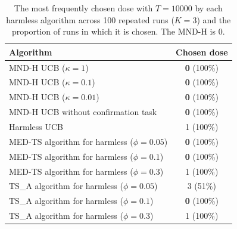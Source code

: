 \begin{table}[tb]
\centering
\caption{The most frequently chosen dose with $T=10000$ by each harmless algorithm across 100 repeated runs ($K=3$) and the proportion of runs in which it is chosen. The MND-H is 0.}
\label{tab:table7}
\begin{tabular}{lc}
\hline
Algorithm & Chosen dose \\
\hline
MND-H UCB ($\kappa=1$) & \textbf{0} (100\%) \\
MND-H UCB ($\kappa=0.1$) & \textbf{0} (100\%) \\
MND-H UCB ($\kappa=0.01$) & \textbf{0} (100\%) \\
\hline
MND-H UCB without confirmation task & \textbf{0} (100\%) \\
Harmless UCB & 1 (100\%) \\
MED-TS algorithm for harmless ($\phi=0.05$) & \textbf{0} (100\%) \\
MED-TS algorithm for harmless ($\phi=0.1$) & \textbf{0} (100\%) \\
MED-TS algorithm for harmless ($\phi=0.3$) & 1 (100\%) \\
TS\_A algorithm for harmless ($\phi=0.05$) & 3 (51\%) \\
TS\_A algorithm for harmless ($\phi=0.1$) & \textbf{0} (100\%) \\
TS\_A algorithm for harmless ($\phi=0.3$) & 1 (100\%) \\
\hline
\end{tabular}
\end{table}
